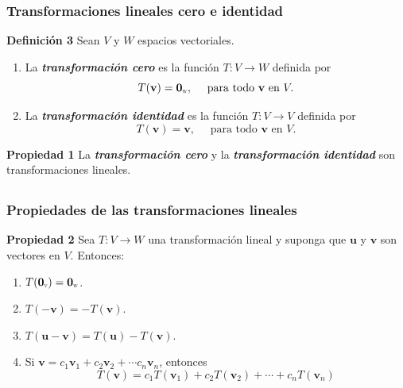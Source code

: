 \begin{frame}\frametitle{Transformaciones lineales cero e identidad}

\begin{defi}{\textbf{Definición 3 }}\justifying
	Sean $V$ y $W$ espacios vectoriales.
	\begin{enumerate}
		\item[\labelname{$a$}] La \textbf{\textit{transformación cero}} es la función $T:V\to W$ definida por
		\[
			T(\mathbf{v}) = \mathbf{0}_{\scalebox{0.4}{W}}, \quad \text{ para todo } \mathbf{v} \text{ en } V.
		\]
		\item[\labelname{$b$}] La \textbf{\textit{transformación identidad}} es la función $T:V\to V$ definida por
		\[
		T(\mathbf{v}) = \mathbf{v}, \quad \text{ para todo } \mathbf{v} \text{ en } V.
		\]
	\end{enumerate}
\end{defi}	

\begin{prop}{\textbf{Propiedad 1}}
	\justifying
	La \textbf{\textit{transformación cero}} y la \textbf{\textit{transformación identidad}} son transformaciones lineales.
\end{prop}	

\end{frame}


\subsection{}

\begin{frame}\frametitle{Propiedades de las transformaciones lineales}
	
	\begin{prop}{\textbf{Propiedad 2}}
		\justifying
		Sea $T:V\to W$ una transformación lineal y suponga que $\mathbf{u}$ y $\mathbf{v}$ son vectores en $V$.
		Entonces:
		\begin{enumerate}
			\item[\labelname{$a$}] $T(\mathbf{0}_{\scalebox{0.4}{V}})=\mathbf{0}_{\scalebox{0.4}{W}}$.
			\item[\labelname{$b$}] $T(-\mathbf{v})=-T(\mathbf{v})$.
			\item[\labelname{$c$}] $T(\mathbf{u}-\mathbf{v})=T(\mathbf{u})-T(\mathbf{v})$.
			\item[\labelname{$d$}] Si $\mathbf{v} = c_1\mathbf{v}_1 + c_2\mathbf{v}_2 + \cdots c_n\mathbf{v}_n$, entonces
			\[
			T(\mathbf{v}) =  c_1T(\mathbf{v}_1) + c_2T(\mathbf{v}_2) + \cdots + c_nT(\mathbf{v}_n)
			\]
		\end{enumerate}
	\end{prop}	
		
	
\end{frame}


